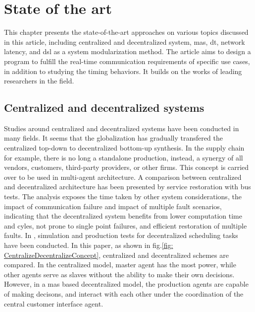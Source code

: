\chapter{State of the art}%
This chapter presents the state-of-the-art approaches on various topics 
discussed 
in this article, including centralized and decentralized system, 
\gls{mas}, \gls{dt}, network latency, 
and \gls{dsl} as a system modularization method. The article aims to 
design a program to fulfill the real-time communication requirements 
of specific use cases, in addition to studying the timing behaviors. 
It builds on the works of leading researchers in the field.


\section{Centralized and decentralized systems}
Studies around centralized and decentralized systems have been conducted 
in many fields. It seems that the globalization has gradually transfered the 
centralized top-down to decentralized bottom-up synthesis\cite{ueda_emergent_2004}.   
In the supply chain for example, there is no long a standalone production, instead, 
a synergy of all vendors, customers, third-party providers, or other
ﬁrms\cite{mahapatra_modeling_2003}. This concept is carried over to be used 
in multi-agent architecture. A comparison between centralized and decentralized 
architecture has been presented by service restoration with bus tests. The 
analysis exposes the time taken by other system considerations, the impact 
of communication failure and impact of multiple fault scenarios, indicating 
that the decentralized system benefits from lower computation time and cyles, 
not prone to single point failures, and efficient restoration of 
multiple faults\cite{sharma_comparative_2016}. 
In \cite{egger_deployment-friendly_2020}, simulation and production tests 
for decentralized scheduling tasks have been conducted. In this paper, as shown 
in fig.\ref{fig: CentralizeDecentralizeConcept}, centralized and decentralized 
schemes are compared. In the centralized model, master agent has the most power, 
while other agents serve as slaves without the ability to make their own decisions. 
However, in a \gls{mas} based decentralized model, the production agents are 
capable of making decisons, and interact with each other under the coordination 
of the central customer interface agent. 


